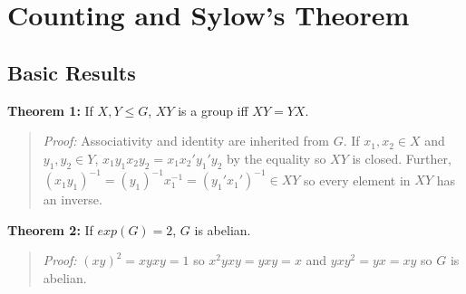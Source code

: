 \chapter{Counting and Sylow's Theorem}
\section {Basic Results}
{\bf Theorem 1:} If $X, Y \leq G$,  $XY$ is a group iff $XY=YX$.
\begin{quote}
\emph{Proof:} 
Associativity and identity are inherited from $G$. If 
$x_1,x_2 \in X$ and
$y_1,y_2 \in Y$, $x_1 y_1 x_2 y_2=
x_1  x_2' y_1' y_2$ by the equality so $XY$ is closed. Further, $
(x_1 y_1)^{-1}= 
(y_1)^{-1} x_1^{-1} =
(y_1' x_1')^{-1} \in XY$ so every element in $XY$ has an inverse.
\end{quote}
{\bf Theorem 2:} If $exp(G)=2$, $G$ is abelian.
\begin{quote}
\emph{Proof:} 
$(xy)^2= xyxy=1$ so $x^2yxy= yxy= x$ and $yxy^2= yx= xy$ so $G$ is abelian.
\end{quote}
